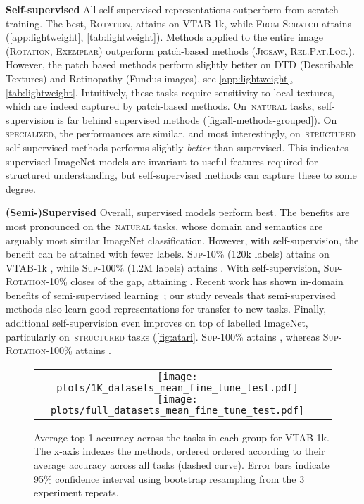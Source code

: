 \documentclass{article}
\newcommand{\myparagraph}[1]{\noindent\textbf{#1}\quad}
\DeclareRobustCommand{\taskNatural}{\raisebox{0.5pt}{\tikz{\fill[natural] (0cm,0cm) circle (.5ex);}}\,\textsc{natural}}
\DeclareRobustCommand{\taskSpecialized}{\raisebox{0.5pt}{\tikz{\fill[specialized] (0,0) circle (.5ex);}}\,\textsc{specialized}}
\DeclareRobustCommand{\taskStructured}{\raisebox{0.5pt}{\tikz{\fill[structured] (0,0) circle (.5ex);}}\,\textsc{structured}}
\newcommand{\imagenet}{ImageNet}
\begin{document}
\myparagraph{Self-supervised}
All self-supervised representations outperform from-scratch training.
The best, \textsc{Rotation}, attains  on VTAB-1k, while \textsc{From-Scratch} attains  (\cref{app:lightweight}, \cref{tab:lightweight}).
Methods applied to the entire image (\textsc{Rotation}, \textsc{Exemplar}) outperform patch-based methods (\textsc{Jigsaw}, \textsc{Rel.Pat.Loc.}).
However, the patch based methods perform slightly better on DTD (Describable Textures) and Retinopathy (Fundus images), see \cref{app:lightweight}, \cref{tab:lightweight}.
Intuitively, these tasks require sensitivity to local textures, which are indeed captured by patch-based methods.
On \taskNatural{} tasks, self-supervision is far behind supervised methods (\cref{fig:all-methods-grouped}).
On \taskSpecialized{}, the performances are similar, and most interestingly, on \taskStructured{} self-supervised methods performs slightly \emph{better} than supervised.
This indicates supervised \imagenet{} models are invariant to useful features required for structured understanding, but self-supervised methods can capture these to some degree.

\myparagraph{(Semi-)Supervised}
Overall, supervised models perform best.
The benefits are most pronounced on the \taskNatural{} tasks, whose domain and semantics are arguably most similar \imagenet{} classification.
However, with self-supervision, the benefit can be attained with fewer labels.
\textsc{Sup-10\%} (120k labels) attains  on VTAB-1k , while \textsc{Sup-100\%} (1.2M labels) attains .
With self-supervision, \textsc{Sup-Rotation-10\%} closes  of the gap, attaining .
Recent work has shown in-domain benefits of semi-supervised learning~\citep{henaff2019data,berthelot2019remixmatch}; our study reveals that semi-supervised methods also learn good representations for transfer to new tasks.
Finally, additional self-supervision even improves on top of  labelled \imagenet{}, particularly on \taskStructured{} tasks (\cref{fig:atari}.
\textsc{Sup-100\%} attains , whereas \textsc{Sup-Rotation-100\%} attains .

\begin{SCfigure*}[][t]
  \centering
  \begin{tabular}{cc}
  \texttt{[image: plots/1K\_datasets\_mean\_fine\_tune\_test.pdf]}
  \texttt{[image: plots/full\_datasets\_mean\_fine\_tune\_test.pdf]}
  \end{tabular}
  \caption{
  Average top-1 accuracy across the tasks in each group for VTAB-1k.
  The x-axis indexes the methods, ordered ordered according to their average accuracy across all tasks (dashed curve).
  Error bars indicate 95\% confidence interval using bootstrap resampling from the 3 experiment repeats.
  }
  \label{fig:all-methods}
\end{SCfigure*}
\end{document}
